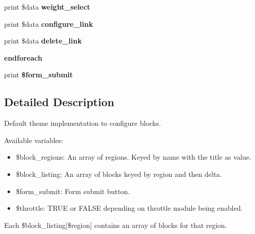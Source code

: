 \begin{CompactItemize}
\item 
\hypertarget{block-admin-display-form_8tpl_8php_1317c2a993afcc9094c904696bf545a3}{
print \$data \textbf{weight\_\-select}}
\label{block-admin-display-form_8tpl_8php_1317c2a993afcc9094c904696bf545a3}

\item 
\hypertarget{block-admin-display-form_8tpl_8php_3b905d71bafd9f290185e863d5ecbb74}{
print \$data \textbf{configure\_\-link}}
\label{block-admin-display-form_8tpl_8php_3b905d71bafd9f290185e863d5ecbb74}

\item 
\hypertarget{block-admin-display-form_8tpl_8php_023a97f76e36659b1f43c5162246e185}{
print \$data \textbf{delete\_\-link}}
\label{block-admin-display-form_8tpl_8php_023a97f76e36659b1f43c5162246e185}

\item 
\hypertarget{block-admin-display-form_8tpl_8php_672d9707ef91db026c210f98cc601123}{
\textbf{endforeach}}
\label{block-admin-display-form_8tpl_8php_672d9707ef91db026c210f98cc601123}

\item 
\hypertarget{block-admin-display-form_8tpl_8php_781a0b4540f3c04b33978b845353b2ab}{
print \textbf{\$form\_\-submit}}
\label{block-admin-display-form_8tpl_8php_781a0b4540f3c04b33978b845353b2ab}

\end{CompactItemize}


\subsection{Detailed Description}
Default theme implementation to configure blocks.

Available variables:\begin{itemize}
\item \$block\_\-regions: An array of regions. Keyed by name with the title as value.\item \$block\_\-listing: An array of blocks keyed by region and then delta.\item \$form\_\-submit: Form submit button.\item \$throttle: TRUE or FALSE depending on throttle module being enabled.\end{itemize}


Each \$block\_\-listing\mbox{[}\$region\mbox{]} contains an array of blocks for that region.

